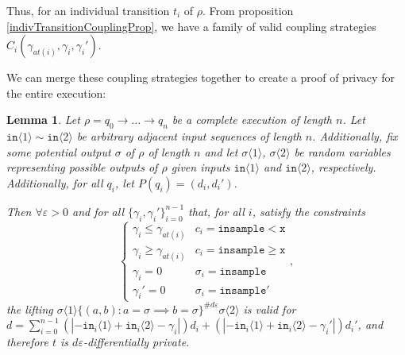 \documentclass[12pt]{article}
\newcommand{\gguard}[1][x]{\texttt{insample}\geq #1}
\newcommand{\lguard}[1][x]{\texttt{insample} < #1}
\newcommand{\brangle}[1]{\langle #1 \rangle}
\newtheorem{lemma}[thm]{Lemma}
\theoremstyle{definition}
\begin{document}
Thus, for an individual transition $t_i$ of $\rho$. From proposition \ref{indivTransitionCouplingProp}, we have a family of valid coupling strategies $C_i(\gamma_{at(i)}, \gamma_i, \gamma_i')$. 

We can merge these coupling strategies together to create a proof of privacy for the entire execution: 

\begin{lemma}\label{multTransitionsCouplingProof}
    Let $\rho = q_0\to \ldots \to q_n$ be a complete execution of length $n$. 
    Let $\texttt{in}\brangle{1}\sim \texttt{in}\brangle{2}$ be arbitrary adjacent input sequences of length $n$. Additionally, fix some potential output $\sigma$ of $\rho$ of length $n$ and let $\sigma\brangle{1}$, $\sigma\brangle{2}$ be random variables representing possible outputs of $\rho$ given inputs $\texttt{in}\brangle{1}$ and $\texttt{in}\brangle{2}$, respectively. Additionally, for all $q_i$, let $P(q_i) = (d_i, d_i')$.

    Then $\forall \varepsilon>0$ and for all $\{\gamma_i, \gamma_i'\}_{i=0}^{n-1}$ that, for all $i$, satisfy the constraints \[
        \begin{cases}
          \gamma_i\leq\gamma_{at(i)} & c_i = \lguard[\texttt{x}]\\
          \gamma_i\geq\gamma_{at(i)} & c_i = \gguard[\texttt{x}]\\
          \gamma_i=0 & \sigma_i = \texttt{insample}\\
          \gamma_i'=0 & \sigma_i = \texttt{insample}'
        \end{cases},
      \]
      the lifting $\sigma\brangle{1}\{(a, b): a=\sigma\implies b=\sigma\}^{\#d\varepsilon}\sigma\brangle{2}$ is valid for $d = \sum_{i=0}^{n-1}(|-\texttt{in}_i\brangle{1}+\texttt{in}_i\brangle{2}-\gamma_i|)d_i+(|-\texttt{in}_i\brangle{1}+\texttt{in}_i\brangle{2}-\gamma_i'|)d_i'$, and therefore $t$ is $d\varepsilon$-differentially private. 
\end{lemma}
\end{document}

